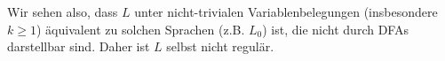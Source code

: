 \begin{enumerate}[a)]
Wir sehen also, dass $L$ unter nicht-trivialen Variablenbelegungen (insbesondere $k \geq 1$) äquivalent zu solchen Sprachen (z.B. $L_0$) ist, die nicht durch DFAs darstellbar sind. Daher ist $L$ selbst nicht regulär.


\end{enumerate}





















